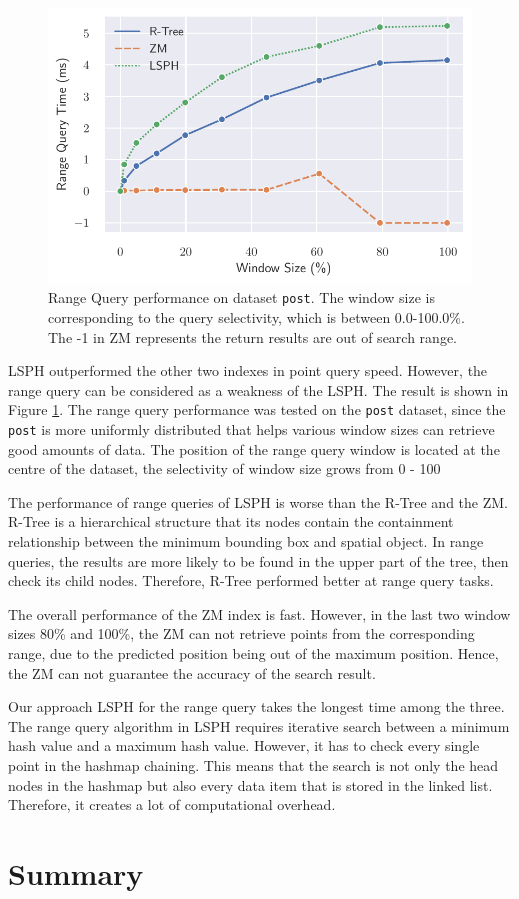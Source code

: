 \begin{figure}
    \includegraphics[width=\textwidth]{Figures/range_result.pdf}\hfill
    \caption{Range Query performance on dataset \texttt{post}. The window size is corresponding to the query selectivity, which is between 0.0-100.0\%. The -1 in ZM represents the return results are out of search range.}\label{fig:range_result}
\end{figure}

LSPH outperformed the other two indexes in point query speed. However, the range query can be considered as a weakness of the LSPH. The result is shown in Figure \ref{fig:range_result}. The range query performance was tested on the \texttt{post} dataset, since the \texttt{post} is more uniformly distributed that helps various window sizes can retrieve good amounts of data. The position of the range query window is located at the centre of the dataset, the selectivity of window size grows from 0 - 100 %

The performance of range queries of LSPH is worse than the R-Tree and the ZM. R-Tree is a hierarchical structure that its nodes contain the containment relationship between the minimum bounding box and spatial object. In range queries, the results are more likely to be found in the upper part of the tree, then check its child nodes. Therefore, R-Tree performed better at range query tasks. 

The overall performance of the ZM index is fast. However, in the last two window sizes 80\% and 100\%, the ZM can not retrieve points from the corresponding range, due to the predicted position being out of the maximum position. Hence, the ZM can not guarantee the accuracy of the search result. 

Our approach LSPH for the range query takes the longest time among the three. The range query algorithm in LSPH requires iterative search between a minimum hash value and a maximum hash value. However, it has to check every single point in the hashmap chaining. This means that the search is not only the head nodes in the hashmap but also every data item that is stored in the linked list. Therefore, it creates a lot of computational overhead. 



\section{Summary}


